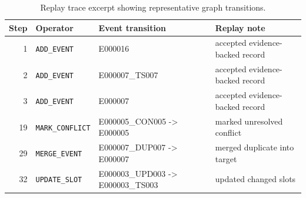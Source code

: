 \begin{table}[t]
\caption{Replay trace excerpt showing representative graph transitions.}
\label{tab:case-study}
\begin{tabular}{@{}rlp{0.28\hsize}p{0.34\hsize}@{}}
\toprule
Step & Operator & Event transition & Replay note\\
\midrule
1 & \texttt{ADD\_EVENT} & E000016 & accepted evidence-backed record\\
2 & \texttt{ADD\_EVENT} & E000007\_TS007 & accepted evidence-backed record\\
3 & \texttt{ADD\_EVENT} & E000007 & accepted evidence-backed record\\
19 & \texttt{MARK\_CONFLICT} & E000005\_CON005 -> E000005 & marked unresolved conflict\\
29 & \texttt{MERGE\_EVENT} & E000007\_DUP007 -> E000007 & merged duplicate into target\\
32 & \texttt{UPDATE\_SLOT} & E000003\_UPD003 -> E000003\_TS003 & updated changed slots\\
\bottomrule
\end{tabular}
\end{table}
